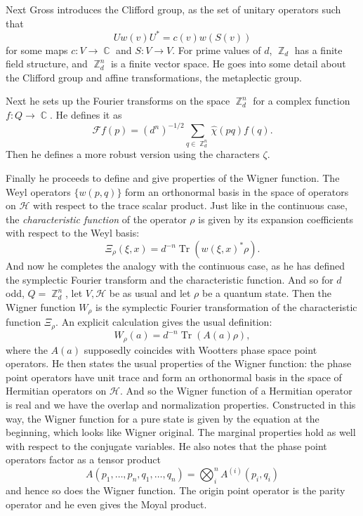 \documentclass[a4paper]{article}
\DeclareMathOperator{\C}{\mathbb{C}}
\DeclareMathOperator{\Z}{\mathbb{Z}}
\DeclareMathOperator{\Tr}{Tr}
\begin{document}
  Next Gross introduces the Clifford group, as the set of
  unitary operators such that
  \[
    Uw(v)U^{*} = c(v)w(S(v))
  \] 
  for some maps $c: V \to \C$ and $S : V \to V$. For prime
  values of $d$, $\Z_d$ has a finite field structure, and
  $\Z_d^{n}$ is a finite vector space. He goes into some
  detail about the Clifford group and affine
  transformations, the metaplectic group.

  Next he sets up the Fourier transforms on the space
  $\Z_d^n$ for a complex function $f: Q \to \C$. He defines
  it as
  \[
    \mathcal Ff(p)
    = (d^{n})^{-1 / 2} \sum_{q \in \Z_d^{n}}^{}
    \hat\chi(pq)f(q).
  \] 
  Then he defines a more robust version using the characters
  $\zeta$.

  Finally he proceeds to define and give properties of the
  Wigner function. The Weyl operators $\{w(p,q)\}$ form an
  orthonormal basis in the space of operators on $\mathcal
  H$ with respect to the trace scalar product. Just like in
  the continuous case, the \textit{characteristic function}
  of the operator $\rho$ is given by its expansion
  coefficients with respect to the Weyl basis:
  \[
    \Xi_\rho(\xi,x)
    = d^{-n} \Tr(w(\xi,x)^{*}\rho).
  \] 
  And now he completes the analogy with the continuous case,
  as he has defined the symplectic Fourier transform and the
  characteristic function. And so for $d$ odd, $Q =
  \Z_d^{n}$, let $V, \mathcal H$ be as usual and let $\rho$ 
  be a quantum state. Then the Wigner function $W_\rho$ is
  the symplectic Fourier transformation of the
  characteristic function $\Xi_\rho$. An explicit
  calculation gives the usual definition:
  \[
    W_\rho(a)
    = d^{-n} \Tr(A(a)\rho),
  \] 
  where the $A(a)$ supposedly coincides with Wootters phase
  space point operators. He then states the usual properties
  of the Wigner function: the phase point operators have
  unit trace and form an orthonormal basis in the space of
  Hermitian operators on $\mathcal H$. And so the Wigner
  function of a Hermitian operator is real and we have the
  overlap and normalization properties. Constructed in this
  way, the Wigner function for a pure state is given by the
  equation at the beginning, which looks like Wigner
  original. The marginal properties hold as well with
  respect to the conjugate variables. He also notes that the
  phase point operators factor as a tensor product
  \[
    A(p_1,\ldots,p_n,q_1,\ldots,q_n)
    = \bigotimes_i^n A^{(i)}(p_i,q_i)
  \] 
  and hence so does the Wigner function. The origin point
  operator is the parity operator and he even gives the
  Moyal product.
\end{document}

